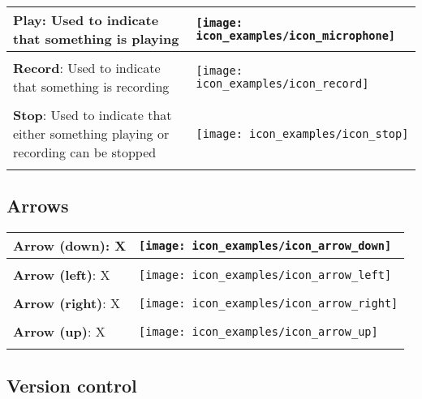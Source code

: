 \begin{longtable}{m{\textwidth-2.2cm} m{1.5cm}}
	\textbf{Play}: Used to indicate that something is playing & \parbox[c]{1.2cm}{
	\texttt{[image: icon\_examples/icon\_microphone]}} \\[0.6cm] \hline \\[-1em]

	\textbf{Record}: Used to indicate that something is recording & \parbox[c]{1.2cm}{
	\texttt{[image: icon\_examples/icon\_record]}} \\[0.6cm] \hline \\[-1em]

	\textbf{Stop}: Used to indicate that either something playing or recording can be stopped & \parbox[c]{1.2cm}{
	\texttt{[image: icon\_examples/icon\_stop]}} \\[0.6cm] \hline \\[-1em]
\end{longtable}


\subsection{Arrows}


\begin{longtable}{m{\textwidth-2.2cm} m{1.5cm}}
	\textbf{Arrow (down)}: X & \parbox[c]{1.2cm}{
	\texttt{[image: icon\_examples/icon\_arrow\_down]}} \\[0.6cm] \hline \\[-1em]

	\textbf{Arrow (left)}: X & \parbox[c]{1.2cm}{
	\texttt{[image: icon\_examples/icon\_arrow\_left]}} \\[0.6cm] \hline \\[-1em]

	\textbf{Arrow (right)}: X & \parbox[c]{1.2cm}{
	\texttt{[image: icon\_examples/icon\_arrow\_right]}} \\[0.6cm] \hline \\[-1em]

	\textbf{Arrow (up)}: X & \parbox[c]{1.2cm}{
	\texttt{[image: icon\_examples/icon\_arrow\_up]}} \\[0.6cm] \hline \\[-1em]
\end{longtable}


\subsection{Version control}

